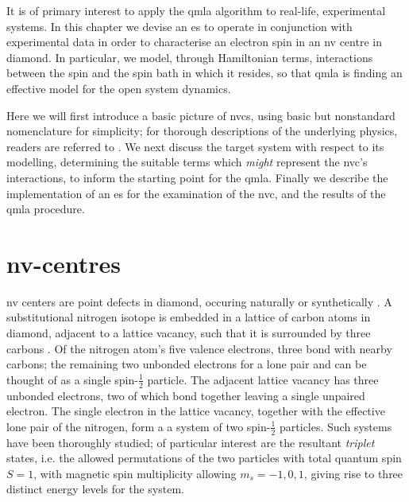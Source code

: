 It is of primary interest to apply the \gls{qmla} algorithm to real-life, experimental systems. 
In this chapter we devise an \gls{es} to operate in conjunction with experimental data 
    in order to characterise an electron spin in an \gls{nv} centre in diamond.
In particular, we model, through Hamiltonian terms, interactions between the spin and 
    the spin bath in which it resides,
    so that \gls{qmla} is finding an effective model for the open system dynamics.
\par

Here we will first introduce a basic picture of \glspl{nvc}, 
    using basic but nonstandard nomenclature for simplicity;
    for thorough descriptions of the underlying physics, readers are referred to \cite{doherty2013nitrogen}.
We next discuss the target system with respect to its modelling, 
    determining the suitable terms which \emph{might} represent the \gls{nvc}'s interactions, 
    to inform the starting point for the \gls{qmla}.
Finally we describe the implementation of an \gls{es} for the examination of the \gls{nvc},
    and the results of the \gls{qmla} procedure. 

\section{\gls{nv}-centres}

\gls{nv} centers are point defects in diamond, 
    occuring naturally \cite{davies1976optical} or synthetically \cite{meijer2005generation, edmonds2012production}.
A substitutional \gls{nitrogen} isotope is embedded in a lattice of carbon atoms in diamond, 
    adjacent to a lattice vacancy, 
    such that it is surrounded by three \glspl{carbon} \cite{lenef1996electronic}. 
Of the \gls{nitrogen} atom's five valence electrons, three bond with nearby \glspl{carbon};
    the remaining two unbonded electrons for a lone pair and can be thought of as a single spin-$\frac{1}{2}$ particle. 
The adjacent lattice vacancy has three unbonded electrons, 
    two of which bond together leaving a single unpaired electron.
The single electron in the lattice vacancy, together with the effective lone pair of the \gls{nitrogen}, 
    form a a system of two spin-$\frac{1}{2}$ particles.
Such systems have been thoroughly studied; 
    of particular interest are the resultant \emph{triplet} states, 
    i.e. the allowed permutations of the two particles with total quantum spin $S=1$, 
    with magnetic spin multiplicity allowing $m_s = {-1, 0, 1}$, 
    giving rise to three distinct energy levels for the system. 
\par 

